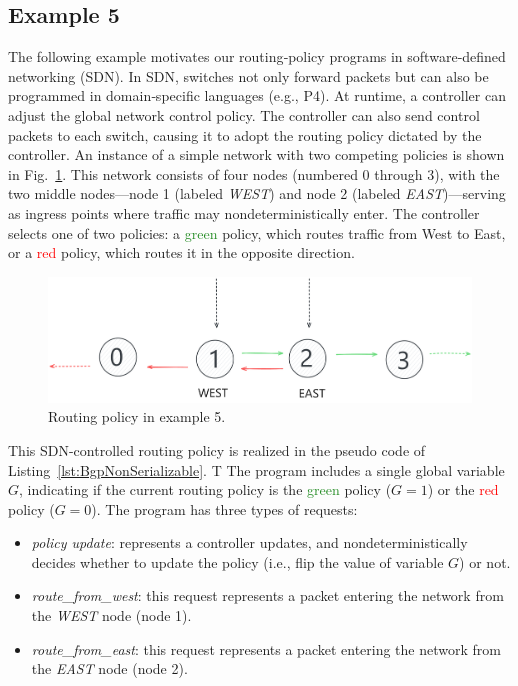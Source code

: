 \subsection{Example 5}

The following example motivates our routing‐policy programs in software‐defined networking (SDN). In SDN, switches not only forward packets but can also be programmed in domain‐specific languages (e.g., P4). At runtime, a controller can adjust the global network control policy. The controller can also send control packets to each switch, causing it to adopt the routing policy dictated by the controller.
%
An instance of a simple network with two competing policies is shown in Fig.~\ref{fig:BgpRoutingPolicies}. This network consists of four nodes (numbered 0 through 3), with the two middle nodes—node 1 (labeled \textit{WEST}) and node 2 (labeled \textit{EAST})—serving as ingress points where traffic may nondeterministically enter. The controller selects one of two policies: a \textcolor{ForestGreen}{green} policy, which routes traffic from West to East, or a \textcolor{red}{red} policy, which routes it in the opposite direction.





\begin{figure}[H]
	\centering
	\includegraphics[width=0.8\linewidth]{plots/east_west_routing.pdf}
	\caption{Routing policy in example 5.}
	\label{fig:BgpRoutingPolicies}
\end{figure}

This SDN-controlled routing policy is realized in the pseudo code of Listing~\ref{lst:BgpNonSerializable}. T
%
The program includes a single global variable $G$, indicating if the current routing policy is the  \textcolor{ForestGreen}{green} policy ($G=1$) or the \textcolor{red}{red} policy ($G=0$).
%
The program has three types of requests:
\begin{itemize}
	
	\item 
	\textit{policy update}: represents a controller updates, and nondeterministically decides whether to update the policy (i.e., flip the value of  variable $G$) or not.
	
	\item 
	\textit{route\_from\_west}: this request represents a packet entering the network from the \textit{WEST} node (node 1).
	
	\item 
	\textit{route\_from\_east}: this request represents a packet entering the network from the \textit{EAST} node (node 2).
	
\end{itemize}


